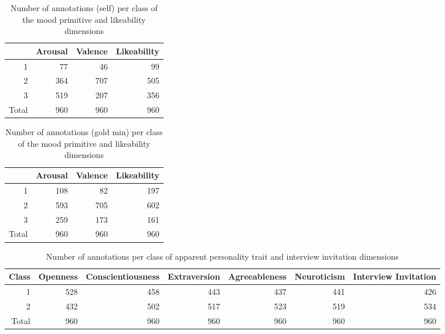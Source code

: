 \begin{table}[h]
\begin{tabular}{|r|r|r|r|}
\hline
\rowcolor[HTML]{C0C0C0} 
\multicolumn{1}{|l|}{\cellcolor[HTML]{C0C0C0}Class} &
  \multicolumn{1}{l|}{\cellcolor[HTML]{C0C0C0}Arousal} &
  \multicolumn{1}{l|}{\cellcolor[HTML]{C0C0C0}Valence} &
  \multicolumn{1}{l|}{\cellcolor[HTML]{C0C0C0}Likeability} \\ \hline
1                           & 77  & 46  & 99  \\
2                           & 364 & 707 & 505 \\
3                           & 519 & 207 & 356 \\ \hline
\multicolumn{1}{|l|}{Total} & 960 & 960 & 960 \\ \hline
\end{tabular}
\caption{Number of annotations (self) per class of the mood primitive and likeability dimensions}
\label{tab:selfcount}
\end{table}

\begin{table}[h]
\begin{tabular}{|r|r|r|r|}
\hline
\rowcolor[HTML]{C0C0C0} 
\multicolumn{1}{|l|}{\cellcolor[HTML]{C0C0C0}Class} &
  \multicolumn{1}{l|}{\cellcolor[HTML]{C0C0C0}Arousal} &
  \multicolumn{1}{l|}{\cellcolor[HTML]{C0C0C0}Valence} &
  \multicolumn{1}{l|}{\cellcolor[HTML]{C0C0C0}Likeability} \\ \hline
1                           & 108 & 82  & 197 \\
2                           & 593 & 705 & 602 \\
3                           & 259 & 173 & 161 \\ \hline
\multicolumn{1}{|l|}{Total} & 960 & 960 & 960 \\ \hline
\end{tabular}
\caption{Number of annotations (gold min) per class of the mood primitive and likeability dimensions}
\label{tab:goldcount}
\end{table}

\begin{table*}[th]
\begin{tabular}{|r|r|r|r|r|r|r|}
\hline
\rowcolor[HTML]{C0C0C0} Class &
  \multicolumn{1}{l|}{Openness} &
  \multicolumn{1}{P{2cm}|}{Conscientiousness} &
  \multicolumn{1}{l|}{Extraversion} &
  \multicolumn{1}{P{2cm}|}{Agreeableness} &
  \multicolumn{1}{l|}{Neuroticism} &
  \multicolumn{1}{P{2cm}|}{Interview Invitation} \\ \hline
1     & 528 & 458 & 443 & 437 & 441 & 426 \\ \hline
2     & 432 & 502 & 517 & 523 & 519 & 534 \\ \hline
Total & 960 & 960 & 960 & 960 & 960 & 960 \\ \hline
\end{tabular}
\caption{Number of annotations per class of apparent personality trait and interview invitation dimensions}
\label{tab:personcount}
\end{table*}

